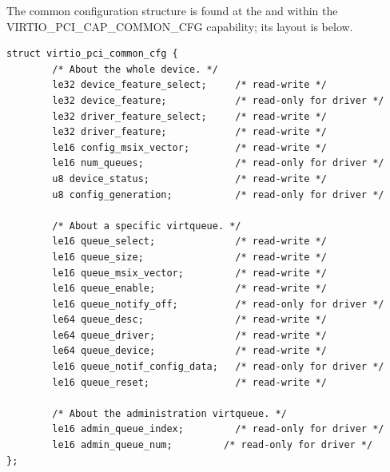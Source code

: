 The common configuration structure is found at the  and  within the VIRTIO_PCI_CAP_COMMON_CFG capability; its layout is below.

\begin{lstlisting}
struct virtio_pci_common_cfg {
        /* About the whole device. */
        le32 device_feature_select;     /* read-write */
        le32 device_feature;            /* read-only for driver */
        le32 driver_feature_select;     /* read-write */
        le32 driver_feature;            /* read-write */
        le16 config_msix_vector;        /* read-write */
        le16 num_queues;                /* read-only for driver */
        u8 device_status;               /* read-write */
        u8 config_generation;           /* read-only for driver */

        /* About a specific virtqueue. */
        le16 queue_select;              /* read-write */
        le16 queue_size;                /* read-write */
        le16 queue_msix_vector;         /* read-write */
        le16 queue_enable;              /* read-write */
        le16 queue_notify_off;          /* read-only for driver */
        le64 queue_desc;                /* read-write */
        le64 queue_driver;              /* read-write */
        le64 queue_device;              /* read-write */
        le16 queue_notif_config_data;   /* read-only for driver */
        le16 queue_reset;               /* read-write */

        /* About the administration virtqueue. */
        le16 admin_queue_index;         /* read-only for driver */
        le16 admin_queue_num;         /* read-only for driver */
};
\end{lstlisting}

